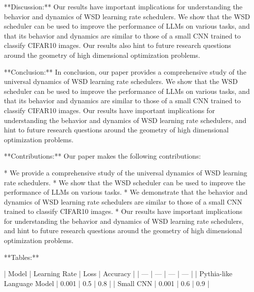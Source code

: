 **Discussion:**
Our results have important implications for understanding the behavior and dynamics of WSD learning rate schedulers. We show that the WSD scheduler can be used to improve the performance of LLMs on various tasks, and that its behavior and dynamics are similar to those of a small CNN trained to classify CIFAR10 images. Our results also hint to future research questions around the geometry of high dimensional optimization problems.

**Conclusion:**
In conclusion, our paper provides a comprehensive study of the universal dynamics of WSD learning rate schedulers. We show that the WSD scheduler can be used to improve the performance of LLMs on various tasks, and that its behavior and dynamics are similar to those of a small CNN trained to classify CIFAR10 images. Our results have important implications for understanding the behavior and dynamics of WSD learning rate schedulers, and hint to future research questions around the geometry of high dimensional optimization problems.

**Contributions:**
Our paper makes the following contributions:

* We provide a comprehensive study of the universal dynamics of WSD learning rate schedulers.
* We show that the WSD scheduler can be used to improve the performance of LLMs on various tasks.
* We demonstrate that the behavior and dynamics of WSD learning rate schedulers are similar to those of a small CNN trained to classify CIFAR10 images.
* Our results have important implications for understanding the behavior and dynamics of WSD learning rate schedulers, and hint to future research questions around the geometry of high dimensional optimization problems.

**Tables:**

| Model | Learning Rate | Loss | Accuracy |
| --- | --- | --- | --- |
| Pythia-like Language Model | 0.001 | 0.5 | 0.8 |
| Small CNN | 0.001 | 0.6 | 0.9 |

